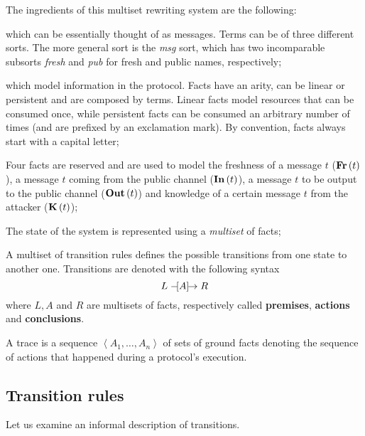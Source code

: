 The ingredients of this multiset rewriting system are the following:

\begin{description}[style=nextline]
    \item[Terms] which can be essentially thought of as messages. Terms can be of three different sorts. The more general sort is the \textit{msg} sort, which has two incomparable subsorts \textit{fresh} and \textit{pub} for fresh and public names, respectively;
    \item[Facts] which model information in the protocol. Facts have an arity, can be linear or persistent and are composed by terms. Linear facts model resources that can be consumed once, while persistent facts can be consumed an arbitrary number of times (and are prefixed by an exclamation mark). By convention, facts always start with a capital letter;
    \item[Special facts] Four facts are reserved and are used to model the freshness of a message $t$ ($\mbox{\textbf{Fr}}\left(t\right)$), a message $t$ coming from the public channel ($\mbox{\textbf{In}}\left(t\right)$), a message $t$ to be output to the public channel ($\mbox{\textbf{Out}}\left(t\right)$) and knowledge of a certain message $t$ from the attacker ($\mbox{\textbf{K}}\left(t\right)$);
    \item[State of the system] The state of the system is represented using a \textit{multiset} of facts;
    \item[Transition rules] A multiset of transition rules defines the possible transitions from one state to another one. Transitions are denoted with the following syntax
        \begin{equation}
            L \mathrel{-\hspace{-2pt}[A]\hspace{-4pt}\to} R
        \end{equation}
        where $L, A$ and $R$ are multisets of facts, respectively called \textbf{premises}, \textbf{actions} and \textbf{conclusions}.
    \item[Trace] A trace is a sequence $\left<A_1, \dots, A_n\right>$ of sets of ground facts denoting the sequence of actions that happened during a protocol's execution.
\end{description}


\subsection{Transition rules}
\label{sub:Transition-rules}
Let us examine an informal description of transitions.

